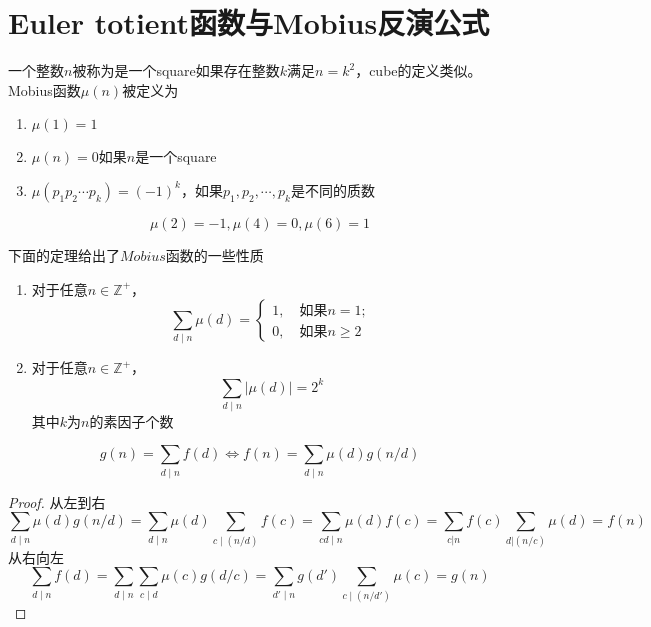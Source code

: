 \section{Euler totient函数与Mobius反演公式}
\begin{definition}[Mobius函数]
	一个整数$n$被称为是一个square如果存在整数$k$满足$n = k^2$，cube的定义类似。Mobius函数$\mu(n)$被定义为
	\begin{enumerate}
		\item $\mu(1) = 1$
		\item $\mu(n) = 0$如果$n$是一个square
		\item $\mu(p_1p_2\cdots p_k) = (-1)^k$，如果$p_1, p_2, \cdots, p_k$是不同的质数
	\end{enumerate}
\end{definition}
\begin{example}
	\begin{equation*}
		\mu(2) = -1,\mu(4) = 0,\mu(6) = 1
	\end{equation*}
\end{example}
下面的定理给出了$Mobius$函数的一些性质
\begin{proposition}
	\begin{enumerate}
		\item 对于任意$n\in \mathbb{Z}^+$，
		\begin{equation*}
			\sum\limits_{d\mid n}\mu(d) = 
			\begin{cases}
				1,\quad \text{如果}n=1;\\
				0,\quad \text{如果}n\geq 2
			\end{cases}
		\end{equation*}
		\item 对于任意$n\in \mathbb{Z}^+$，
		\begin{equation*}
			\sum\limits_{d\mid n}|\mu(d)| = 2^k
		\end{equation*}
		其中$k$为$n$的素因子个数
	\end{enumerate}
\end{proposition}
\begin{theorem}[Mobius反演公式]
	\begin{equation*}
		g(n) = \sum\limits_{d\mid n}f(d) \Leftrightarrow f(n) = \sum\limits_{d\mid n}\mu(d)g(n/d)
	\end{equation*}
\end{theorem}
\begin{proof}
	从左到右
	\begin{equation*}
		\sum\limits_{d\mid n}\mu(d)g(n/d) = \sum\limits_{d\mid n}\mu(d)\sum\limits_{c\mid (n/d)}f(c) = \sum\limits_{cd\mid n}\mu(d)f(c) = \sum\limits_{c|n}f(c)\sum\limits_{d|(n/c)}\mu(d) = f(n)
	\end{equation*}
	从右向左
	\begin{equation*}
		\sum\limits_{d\mid n}f(d) =\sum\limits_{d\mid n} \sum\limits_{c\mid d} \mu(c)g(d/c) = \sum\limits_{d'\mid n}g(d')\sum\limits_{c\mid (n/d')}\mu(c) = g(n)
	\end{equation*}
\end{proof}
